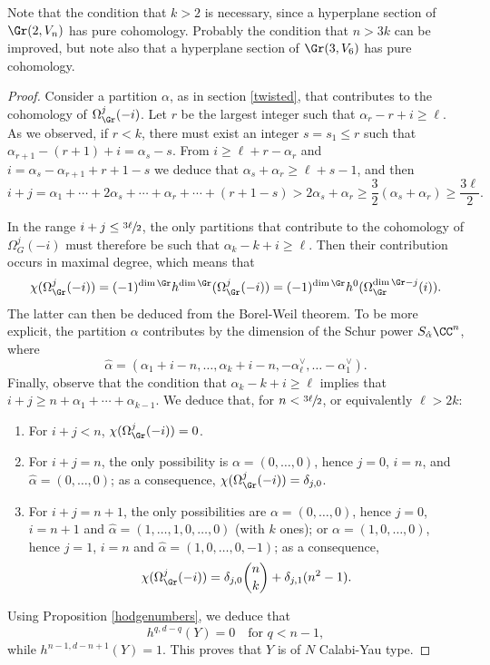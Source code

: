 Note that the condition that $k>2$ is necessary, since a hyperplane section of $\Gr(2,V_n)$
has pure cohomology. Probably the condition that $n>3k$ can be improved, but note also that a
hyperplane section of $\Gr(3,V_6)$ has pure cohomology.

\begin{proof}
Consider a partition $\alpha$, as in section \ref{twisted}, that contributes to the
cohomology of $\Omega^j_{\Gr}(-i)$. Let $r$ be the
largest integer such that $\alpha_r-r+i\ge \ell$. As we observed, if $r<k$, there must
exist an integer $s=s_1\le r$ such that $\alpha_{r+1}-(r+1)+i=\alpha_{s}-s$.
From $i\ge \ell+r-\alpha_r$ and $i=\alpha_s-\alpha_{r+1}+r+1-s$ we deduce
that $\alpha_s+\alpha_r\ge \ell+s-1$, and then
\[
i+j =\alpha_1+\cdots +2\alpha_s+\cdots +\alpha_r+\cdots +(r+1-s)>2\alpha_s+\alpha_r\ge \frac{3}{2}(\alpha_s+\alpha_r)
\ge \frac{3\ell}{2}.
\]

In the range $i+j\le \sfrac{3\ell}{2}$, the only partitions that contribute to the cohomology of
$\Omega_G^j(-i)$ must therefore be such that $\alpha_k-k+i\ge \ell$. Then their contribution
occurs in maximal degree, which means that
\[
\chi(\Omega_{\Gr}^j(-i))=(-1)^{\dim {\Gr}}h^{\dim {\Gr}}(\Omega_{\Gr}^j(-i))=(-1)^{\dim {\Gr}}h^0(\Omega_{\Gr}^{\dim {\Gr}-j}(i)).
\]
The latter can then be deduced from the Borel-Weil theorem. To be more explicit, the partition
$\alpha$ contributes by the dimension of the Schur power $S_{\hat{\alpha}}\CC^n$,
where
\[
\hat{\alpha} = (\alpha_1+i-n,\ldots ,\alpha_k+i-n,-\alpha_\ell^\vee, \ldots -\alpha_1^\vee).
\] Finally, observe that the condition that
$\alpha_k-k+i\ge \ell$ implies that $i+j\ge n+\alpha_1+\cdots +\alpha_{k-1}$. We deduce
that, for $n<\sfrac{3\ell}{2}$, or equivalently $\ell >2k$:
\begin{enumerate}
\item For $i+j<n$, $\chi(\Omega_{\Gr}^j(-i))=0$.
\item For $i+j=n$, the only possibility is $\alpha = (0,\ldots ,0)$, hence $j=0$, $i=n$, and $\hat{\alpha}=(0,\ldots ,0)$; as a consequence, $\chi(\Omega_{\Gr}^j(-i))=\delta_{j,0}$.
\item For $i+j=n+1$, the only possibilities are $\alpha = (0,\ldots ,0)$, hence $j=0$, $i=n+1$
and $\hat{\alpha}=(1,\ldots ,1,0,\ldots ,0)$ (with $k$ ones); or $\alpha = (1,0,\ldots ,0)$,
hence $j=1$, $i=n$ and $\hat{\alpha}=(1,0,\ldots ,0,-1)$; as a consequence,
\[
\chi(\Omega_{\Gr}^j(-i))=\delta_{j,0}\binom{n}{k}+\delta_{j,1}(n^2-1).
\]
\end{enumerate}
Using Proposition \ref{hodgenumbers}, we deduce that
\[
h^{q,d-q}(Y)=0\quad\text{for }q<n-1,
\]
while $h^{n-1,d-n+1}(Y)=1$. This proves that $Y$ is of $N$ Calabi-Yau type.
\end{proof}

